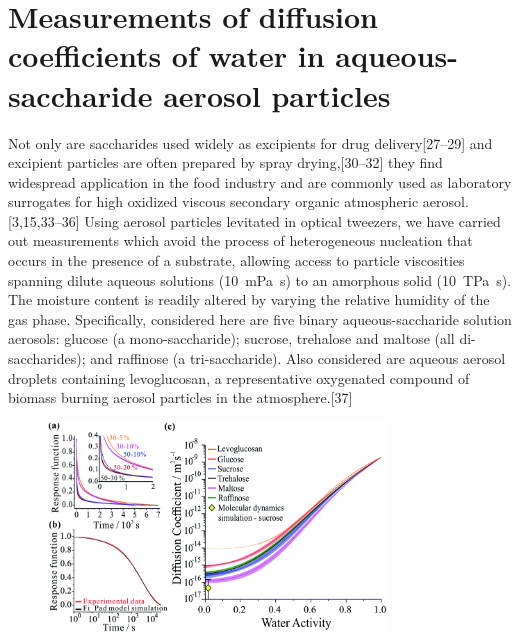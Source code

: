 \section{Measurements of diffusion coefficients of water in aqueous-saccharide aerosol particles}\label{sec:wat_d_coefs}

Not only are saccharides used widely as excipients for drug delivery[27–29] and excipient particles are often prepared by spray drying,[30–32] they find widespread application in the food industry and are commonly used as laboratory surrogates for high oxidized viscous secondary organic atmospheric aerosol.[3,15,33–36] Using aerosol particles levitated in optical tweezers, we have carried out measurements which avoid the process of heterogeneous nucleation that occurs in the presence of a substrate, allowing access to particle viscosities spanning dilute aqueous solutions (\SI{10}{\milli\pascal\second}) to an amorphous solid (\SI{10}{\tera\pascal\second}). The moisture content is readily altered by varying the relative humidity of the gas phase. Specifically, considered here are five binary aqueous-saccharide solution aerosols: glucose (a mono-saccharide); sucrose, trehalose and maltose (all di-saccharides); and raffinose (a tri-saccharide). Also considered are aqueous aerosol droplets containing levoglucosan, a representative oxygenated compound of biomass burning aerosol particles in the atmosphere.[37]

\begin{figure}
    \centering
    \includegraphics[width=0.8\textwidth]{chapters/water_hopping/figures/f1.png}
    \label{fig:wat_workflow}
\end{figure}

